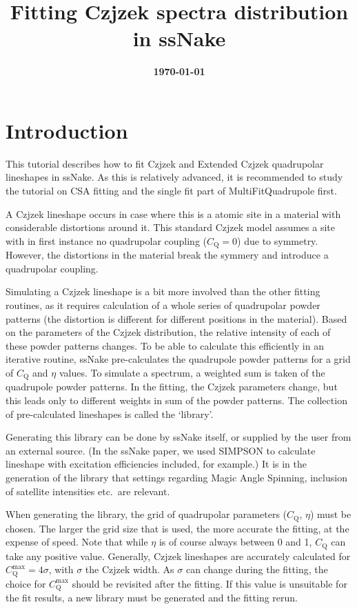 \documentclass[11pt,a4paper]{article}
\title{\color{black}\fontfamily{SourceSansPro-LF}\bfseries Fitting Czjzek spectra distribution in ssNake}
\author{}
\date{\color{black}\fontfamily{SourceSansPro-LF}\bfseries \today}
\begin{document}

\maketitle

\section{Introduction}
This tutorial describes how to fit Czjzek and Extended Czjzek quadrupolar lineshapes in ssNake. As this is relatively advanced, it is recommended to study the tutorial on CSA fitting and the single fit part of MultiFitQuadrupole first.

A Czjzek lineshape occurs in case where this is a atomic site in a material with considerable distortions around it. This standard Czjzek model assumes a site with in first instance no quadrupolar coupling ($C_\text{Q}=0$) due to symmetry. However, the distortions in the material break the symmery and introduce a quadrupolar coupling.

Simulating a Czjzek lineshape is a bit more involved than the other fitting routines, as it requires calculation of a whole series of quadrupolar powder patterns (the distortion is different for different positions in the material). Based on the parameters of the Czjzek distribution, the relative intensity of each of these powder patterns changes. To be able to calculate this efficiently in an iterative routine, ssNake pre-calculates the quadrupole powder patterns for a grid of $C_\text{Q}$ and $\eta$ values. To simulate a spectrum, a weighted sum is taken of the quadrupole powder patterns. In the fitting, the Czjzek parameters change, but this leads only to different weights in sum of the powder patterns. The collection of pre-calculated lineshapes is called the `library'.

Generating this library can be done by ssNake itself, or supplied by the user from an external source. (In the ssNake paper, we used SIMPSON to calculate lineshape with excitation efficiencies included, for example.) It is in the generation of the library that settings regarding Magic Angle Spinning, inclusion of satellite intensities etc.\ are relevant.

When generating the library, the grid of quadrupolar parameters ($C_\text{Q}$, $\eta$) must be chosen. The larger the grid size that is used, the more accurate the fitting, at the expense of speed. Note that while $\eta$ is of course always between 0 and 1, $C_\text{Q}$ can take any positive value. Generally, Czjzek lineshapes are accurately calculated for $C_\text{Q}^\text{max} = 4\sigma$, with $\sigma$ the Czjzek width. As $\sigma$ can change during the fitting, the choice for $C_\text{Q}^\text{max}$ should be revisited after the fitting. If this value is unsuitable for the fit results, a new library must be generated and the fitting rerun.
\end{document}
